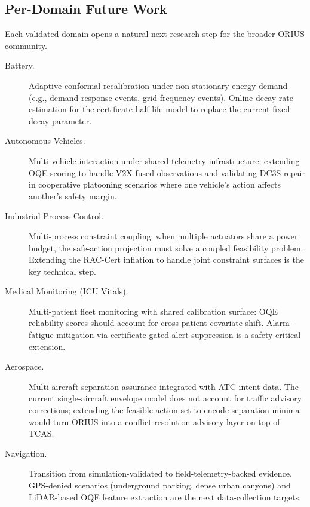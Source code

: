 \subsection{Per-Domain Future Work}

Each validated domain opens a natural next research step for the broader
ORIUS community.

\begin{description}
  \item[Battery.] Adaptive conformal recalibration under non-stationary
    energy demand (e.g., demand-response events, grid frequency events).
    Online decay-rate estimation for the certificate half-life model to
    replace the current fixed decay parameter.

  \item[Autonomous Vehicles.] Multi-vehicle interaction under shared
    telemetry infrastructure: extending OQE scoring to handle V2X-fused
    observations and validating DC3S repair in cooperative platooning
    scenarios where one vehicle's action affects another's safety margin.

  \item[Industrial Process Control.] Multi-process constraint coupling:
    when multiple actuators share a power budget, the safe-action projection
    must solve a coupled feasibility problem.  Extending the RAC-Cert
    inflation to handle joint constraint surfaces is the key technical step.

  \item[Medical Monitoring (ICU Vitals).] Multi-patient fleet monitoring
    with shared calibration surface: OQE reliability scores should account
    for cross-patient covariate shift.  Alarm-fatigue mitigation via
    certificate-gated alert suppression is a safety-critical extension.

  \item[Aerospace.] Multi-aircraft separation assurance integrated with
    ATC intent data.  The current single-aircraft envelope model does not
    account for traffic advisory corrections; extending the feasible action
    set to encode separation minima would turn ORIUS into a conflict-resolution
    advisory layer on top of TCAS.

  \item[Navigation.] Transition from simulation-validated to
    field-telemetry-backed evidence.  GPS-denied scenarios (underground
    parking, dense urban canyons) and LiDAR-based OQE feature extraction
    are the next data-collection targets.
\end{description}

